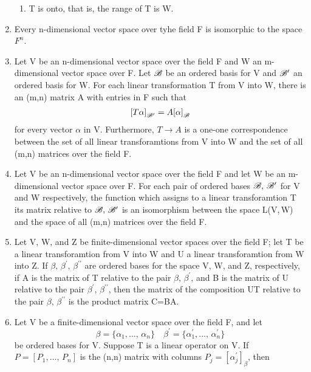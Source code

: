 \documentclass[12pt, a4paper]{article}
\begin{document}
\begin{CJK*}{UTF8}{bsmi}
\begin{enumerate}
\begin{enumerate}
        \item T is onto, that is, the range of T is W.
    \end{enumerate}
    \item Every n-dimensional vector space over tyhe field F is isomorphic to the space \(F^n\).
    \item Let V be an n-dimensional vector space over the field F and W an m-dimensional vector space over F. Let \(\mathscr{B}\) be an ordered basis for V and \(\mathscr{B^\prime}\) an ordered basis for W. For each linear transformation T from V into W, there is an (m,n) matrix A with entries in F such that\begin{eqnarray}
        {[T\alpha]}_{\mathscr{B^\prime}} = A{[\alpha]}_{\mathscr{B}}
    \end{eqnarray}
    for every vector \(\alpha\) in V. Furthermore, \(T\xrightarrow{}A\) is a one-one correspondence between the set of all linear transforamtions from V into W and the set of all (m,n) matrices over the field F.
    \item Let V be an n-dimensional vector space over the field F and let W be an m-dimensional vector space over F. For each pair of ordered bases \(\mathscr{B,\,B^\prime}\) for V and W respectively, the function which assigns to a linear transforamtion T its matrix relative to \(\mathscr{B,\,B^\prime}\) is an isomorphism between the space L(V,\,W) and the space of all (m,n) matrices over the field F.
    \item Let V, W, and Z be finite-dimensional vector spaces over the field F; let T be a linear transforamtion from V into W and U a linear transforamtion from W into Z. If \(\beta,\,\beta^\prime,\,\beta^{\prime\prime}\) are ordered bases for the space V, W, and Z, respectively, if A is the matrix of T relative to the pair \(\beta,\,\beta^\prime\), and B is the matrix of U relative to the pair \(\beta^\prime,\,\beta^{\prime\prime}\), then the matrix of the composition UT relative to the pair \(\beta,\,\beta^{\prime\prime}\) is the product matrix C=BA.
    \item Let V be a finite-dimensional vector space over the field F, and let\begin{equation}
        \beta = \{\alpha_1,\ldots,\,\alpha_n\}\quad \beta^\prime = \{\alpha_1^\prime,\ldots,\,\alpha_n^\prime\}
    \end{equation}
    be ordered bases for V. Suppose T is a linear operator on V. If \(P=[P_1,\ldots,\,P_n]\) is the (n,n) matrix with columns \(P_j = [\alpha^\prime_j]_\beta\), then\begin{equation}

\end{equation}
\end{enumerate}
\end{CJK*}
\end{document}

